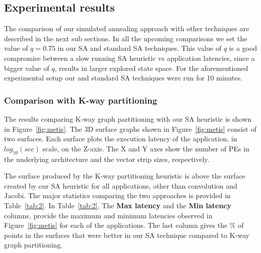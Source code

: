 \subsection{Experimental results}
\label{sec:results}

The comparison of our simulated annealing approach with other techniques
are described in the next sub sections. In all the upcoming comparisons
we set the value of $q=0.75$ in our SA and standard SA techniques. This
value of $q$ is a good compromise between a slow running SA heuristic vs
application latencies, since a bigger value of $q$, results in larger
explored state space. For the aforementioned experimental setup our and
standard SA techniques were run for 10 minutes.

\subsubsection{Comparison with K-way partitioning}
\label{sec:comparison-with-k}

The results comparing K-way graph partitioning with our SA heuristic is
shown in Figure~\ref{fig:metis}. The 3D surface graphs shown in
Figure~\ref{fig:metis} consist of two surfaces. Each surface plots the
execution latency of the application, in $log_{10}(sec)$ scale, on the
Z-axis. The X and Y axes show the number of PEs in the underlying
architecture and the vector strip sizes, respectively.

The surface produced by the K-way partitioning heuristic is above the
surface created by our SA heuristic for all applications, other than
convolution and Jacobi. The major statistics comparing the two
approaches is provided in Table~\ref{tab:2}. In Table~\ref{tab:2}, The
\textbf{Max latency} and the \textbf{Min latency} columns, provide the
maximum and minimum latencies observed in Figure~\ref{fig:metis} for
each of the applications. The last column gives the \% of points in the
surfaces that were better in our SA technique compared to K-way graph
partitioning.

